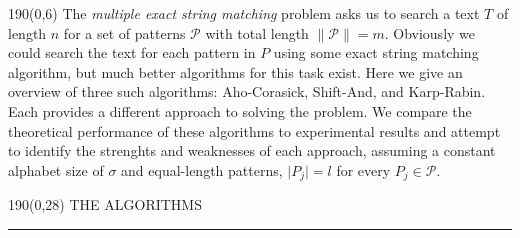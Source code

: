 \documentclass[a4paper]{article} %
\newcommand{\abs}[1]{\lvert#1\rvert}
\newcommand{\norm}[1]{\lVert#1\rVert}
\begin{document}
  \begin{textblock}{190}(0,6)
    \sffamily
    \small The \emph{multiple exact string matching} problem asks us to search a text $T$ of length $n$ for a set of patterns $\mathcal{P}$ with total length $\norm{\mathcal{P}}=m$. Obviously we could search the text for each pattern in $P$ using some exact string matching algorithm, but much better algorithms for this task exist. Here we give an overview of three such algorithms: Aho-Corasick, Shift-And, and Karp-Rabin. Each provides a different approach to solving the problem. We compare the theoretical performance of these algorithms to experimental results and attempt to identify the strenghts and weaknesses of each approach, assuming a constant alphabet size of $\sigma$ and equal-length patterns, $\abs {P_j}  = l$ for every $P_j \in \mathcal P$.
    
  \end{textblock}

  \begin{textblock}{190}(0,28)
    \sffamily
    \Large{\color{sciorange}THE ALGORITHMS}\small\\
    \rule[3mm]{190mm}{0.1pt}
  \end{textblock} 

\end{document}
